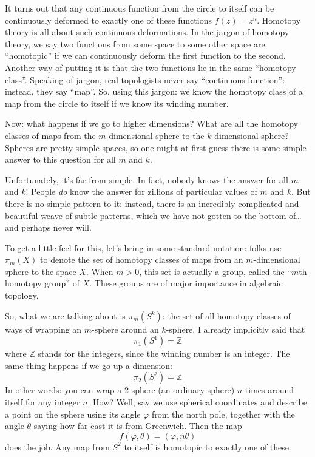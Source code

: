 \documentclass{article}
\begin{document}
It turns out that any continuous function from the circle to itself can
be continuously deformed to exactly one of these functions
\(f(z) = z^n\). Homotopy theory is all about such continuous
deformations. In the jargon of homotopy theory, we say two functions
from some space to some other space are ``homotopic'' if we can
continuously deform the first function to the second. Another way of
putting it is that the two functions lie in the same ``homotopy class''.
Speaking of jargon, real topologists never say ``continuous function'':
instead, they say ``map''. So, using this jargon: we know the homotopy
class of a map from the circle to itself if we know its winding number.

Now: what happens if we go to higher dimensions? What are all the
homotopy classes of maps from the \(m\)-dimensional sphere to the
\(k\)-dimensional sphere? Spheres are pretty simple spaces, so one might
at first guess there is some simple answer to this question for all
\(m\) and \(k\).

Unfortunately, it's far from simple. In fact, nobody knows the answer
for all \(m\) and \(k\)! People \emph{do} know the answer for zillions
of particular values of \(m\) and \(k\). But there is no simple pattern
to it: instead, there is an incredibly complicated and beautiful weave
of subtle patterns, which we have not gotten to the bottom of\ldots{}
and perhaps never will.

To get a little feel for this, let's bring in some standard notation:
folks use \(\pi_m(X)\) to denote the set of homotopy classes of maps
from an \(m\)-dimensional sphere to the space \(X\). When \(m > 0\),
this set is actually a group, called the ``\(m\)th homotopy group'' of
\(X\). These groups are of major importance in algebraic topology.

So, what we are talking about is \(\pi_m(S^k)\): the set of all homotopy
classes of ways of wrapping an \(m\)-sphere around an \(k\)-sphere. I
already implicitly said that \[\pi_1(S^1) = \mathbb{Z}\] where
\(\mathbb{Z}\) stands for the integers, since the winding number is an
integer. The same thing happens if we go up a dimension:
\[\pi_2(S^2) = \mathbb{Z}\] In other words: you can wrap a 2-sphere (an
ordinary sphere) \(n\) times around itself for any integer \(n\). How?
Well, say we use spherical coordinates and describe a point on the
sphere using its angle \(\varphi\) from the north pole, together with
the angle \(\theta\) saying how far east it is from Greenwich. Then the
map \[f(\varphi,\theta) = (\varphi, n\theta)\] does the job. Any map
from \(S^2\) to itself is homotopic to exactly one of these.
\end{document}
